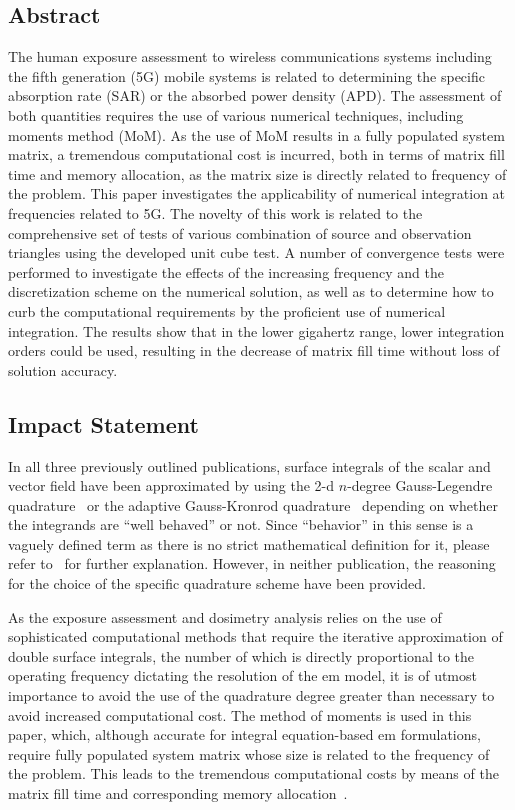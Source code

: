 \subsection{Abstract}
The human exposure assessment to wireless communications systems including the fifth generation (5G) mobile systems is related to determining the specific absorption rate (SAR) or the absorbed power density (APD).
The assessment of both quantities requires the use of various numerical techniques, including moments method (MoM).
As the use of MoM results in a fully populated system matrix, a tremendous computational cost is incurred, both in terms of matrix fill time and memory allocation, as the matrix size is directly related to frequency of the problem.
This paper investigates the applicability of numerical integration at frequencies related to 5G.
The novelty of this work is related to the comprehensive set of tests of various combination of source and observation triangles using the developed unit cube test.
A number of convergence tests were performed to investigate the effects of the increasing frequency and the discretization scheme on the numerical solution, as well as to determine how to curb the computational requirements by the proficient use of numerical integration.
The results show that in the lower gigahertz range, lower integration orders could be used, resulting in the decrease of matrix fill time without loss of solution accuracy.

\subsection{Impact Statement}
In all three previously outlined publications, surface integrals of the scalar and vector field have been approximated by using the \gls{2-d} $n$-degree Gauss-Legendre quadrature~\cite{Abramowitz1972Handbook} or the adaptive Gauss-Kronrod quadrature~\cite{Piessens1983Quadpack} depending on whether the integrands are ``well behaved'' or not.
Since ``behavior'' in this sense is a vaguely defined term as there is no strict mathematical definition for it, please refer to~\cite{Weisstein2023Pathological} for further explanation.
However, in neither publication, the reasoning for the choice of the specific quadrature scheme have been provided.

As the exposure assessment and dosimetry analysis relies on the use of sophisticated computational methods that require the iterative approximation of double surface integrals, the number of which is directly proportional to the operating frequency dictating the resolution of the \gls{em} model, it is of utmost importance to avoid the use of the quadrature degree greater than necessary to avoid increased computational cost.
The method of moments is used in this paper, which, although accurate for integral equation-based \gls{em} formulations, require fully populated system matrix whose size is related to the frequency of the problem.
This leads to the tremendous computational costs by means of the matrix fill time and corresponding memory allocation~\cite{Poljak2018conformal}.

